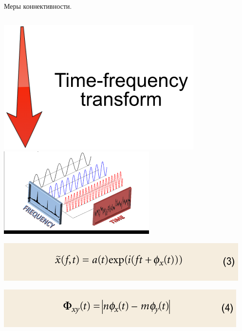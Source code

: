 \documentclass[12pt]{beamer}
\begin{document}
\begin{frame}[t]{Меры коннективности.}
\begin{columns}
\begin{column}{0.5\textwidth}
            \includegraphics[scale=0.2]{tf_arrow.png}
            \includegraphics[scale=0.2]{time-frequency.png}

            \includegraphics[scale=0.3]{eq3.png}

            \includegraphics[scale=0.3]{eq4.png}
        \end{column}
        
    \end{columns}
    \vspace{-0.5cm}
\end{frame}
\end{document}

